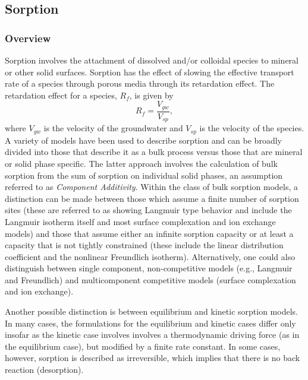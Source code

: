 %
\subsection{Sorption}  \label{sec:Sorption}

\subsubsection{Overview} 

Sorption involves the attachment of dissolved and/or colloidal species to mineral or other solid surfaces.  Sorption has the effect of slowing the effective transport rate of a species through porous media through its retardation effect.  The retardation effect for a species, $R_f$, is given by~\citep{bouwer-1991}
\begin{equation}
  R_f = \frac{V_{gw}}{V_{sp}},
\end{equation}
where 
$V_{gw}$ is the velocity of the groundwater and $V_{sp}$ is the velocity of the species.  
A variety of models have been used to describe sorption and can be broadly divided 
into those that describe it as a bulk process versus those that are mineral or solid phase specific.  
The latter approach involves the calculation of  bulk sorption from the sum of sorption on individual solid phases, 
an assumption referred to as \textit{Component Additivity}.  
Within the class of bulk sorption models, a distinction can be made between those 
which assume a finite number of sorption sites (these are referred to as showing 
Langmuir type behavior and include the Langmuir isotherm itself and most surface complexation 
and ion exchange models) and those that assume either an infinite sorption capacity 
or at least a capacity that is not tightly constrained 
(these include the linear distribution coefficient and the nonlinear Freundlich isotherm).  
Alternatively, one could also distinguish between single component, 
non-competitive models (e.g., Langmuir and Freundlich) and multicomponent competitive models (surface complexation and ion exchange).

Another possible distinction is between equilibrium and kinetic sorption models.  
In many cases, the formulations for the equilibrium and kinetic cases differ 
only insofar as the kinetic case involves involves a thermodynamic driving force 
(as in the equilibrium case), but modified by a finite rate constant.  
In some cases, however, sorption is described as irreversible, which implies that there is no back reaction (desorption).

